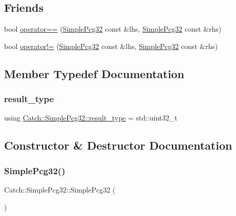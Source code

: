 \subsection*{Friends}
\begin{DoxyCompactItemize}
\item 
bool \mbox{\hyperlink{class_catch_1_1_simple_pcg32_a3f1e143181b91f902ce034e2878f87eb}{operator==}} (\mbox{\hyperlink{class_catch_1_1_simple_pcg32}{Simple\+Pcg32}} const \&lhs, \mbox{\hyperlink{class_catch_1_1_simple_pcg32}{Simple\+Pcg32}} const \&rhs)
\item 
bool \mbox{\hyperlink{class_catch_1_1_simple_pcg32_a4940863fe85f6c5a2fa9b3910bfb7406}{operator!=}} (\mbox{\hyperlink{class_catch_1_1_simple_pcg32}{Simple\+Pcg32}} const \&lhs, \mbox{\hyperlink{class_catch_1_1_simple_pcg32}{Simple\+Pcg32}} const \&rhs)
\end{DoxyCompactItemize}


\subsection{Member Typedef Documentation}
\mbox{\label{class_catch_1_1_simple_pcg32_a220ca38f6d16804c6e99937a673ec3ff}} 
\subsubsection{\texorpdfstring{result\+\_\+type}{result\_type}}
{\footnotesize\ttfamily using \mbox{\hyperlink{class_catch_1_1_simple_pcg32_a220ca38f6d16804c6e99937a673ec3ff}{Catch\+::\+Simple\+Pcg32\+::result\+\_\+type}} =  std\+::uint32\+\_\+t}



\subsection{Constructor \& Destructor Documentation}
\mbox{\label{class_catch_1_1_simple_pcg32_a045c99a96f9b0faf384e22f871576282}} 
\subsubsection{\texorpdfstring{Simple\+Pcg32()}{SimplePcg32()}\hspace{0.1cm}{\footnotesize\ttfamily [1/2]}}
{\footnotesize\ttfamily Catch\+::\+Simple\+Pcg32\+::\+Simple\+Pcg32 (\begin{DoxyParamCaption}{ }\end{DoxyParamCaption})\hspace{0.3cm}{\ttfamily [inline]}}

